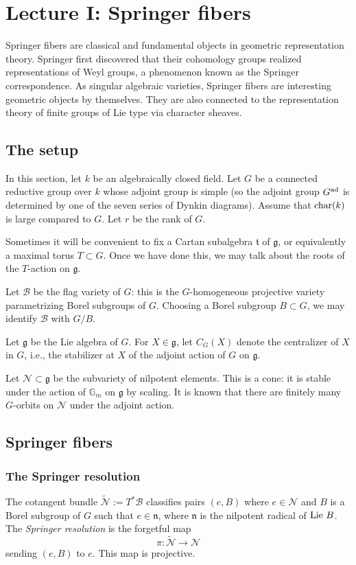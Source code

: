 \documentclass[]{pcmi}
\let\oldsubsubsection\subsubsection
\renewcommand{\subsubsection}[1]{%
\setcounter{subsubsection}{\value{equation}}%
\oldsubsubsection{#1}%
\refstepcounter{equation}%
}
\theoremstyle{plain}
\theoremstyle{definition}
\def\GG{\mathbb{G}}
\newcommand{\sB}{\ensuremath{\mathscr{B}}\xspace}
\newcommand{\sN}{\ensuremath{\mathscr{N}}\xspace}
\newcommand{\sB}{\ensuremath{\mathcal{B}}\xspace}
\newcommand{\sN}{\ensuremath{\mathcal{N}}\xspace}
\newcommand\frg{\mathfrak{g}}
\newcommand\frn{\mathfrak{n}}
\newcommand\frt{\mathfrak{t}}
\newcommand\Lie{\textup{Lie}\ }
\newcommand{\Gm}{\GG_m}
\newcommand{\ad}{\textup{ad}}
\newcommand{\wt}{\widetilde}
\newcommand\chark{\textup{char}(k)}
\newcommand{\tN}{\wt{\sN}}
\begin{document}
\section{Lecture I: Springer fibers}

Springer fibers are classical and fundamental objects in geometric representation theory. Springer \cite{Springer} first discovered that their cohomology groups realized representations of Weyl groups, a phenomenon known as the Springer correspondence. As singular algebraic varieties, Springer fibers are interesting geometric objects by themselves. They are also connected to the representation theory of finite groups of Lie type via character sheaves.

\subsection{The setup}\label{ss:notation}  In this section, let $k$ be an algebraically closed field. Let $G$ be a connected reductive group over $k$ whose adjoint group is simple (so the adjoint group $G^{\ad}$ is determined by one of the seven series of Dynkin diagrams). Assume that $\chark$ is large compared to $G$.  Let $r$ be the rank of $G$.

Sometimes it will be convenient to fix a Cartan subalgebra $\frt$ of $\frg$, or equivalently a maximal torus $T\subset G$. Once we have done this, we may talk about the roots of the $T$-action on $\frg$.
 
Let $\sB$ be the flag variety of $G$: this is the $G$-homogeneous projective variety parametrizing Borel subgroups of $G$. Choosing a Borel subgroup $B\subset G$, we may identify $\sB$ with $G/B$.

Let $\frg$ be the Lie algebra of $G$.  For $X\in\frg$, let $C_{G}(X)$ denote the centralizer of $X$ in $G$, i.e., the stabilizer at $X$ of the adjoint action of $G$ on $\frg$. 

Let $\sN\subset\frg$ be the subvariety of nilpotent elements. This is a cone: it is stable under the action of $\Gm$ on $\frg$ by scaling.  It is known that there are finitely many $G$-orbits on $\sN$ under the adjoint action. 


\subsection{Springer fibers}

\subsubsection{The Springer resolution} The cotangent bundle $\tN:=T^{*}\sB$ classifies pairs $(e, B)$ where $e\in\sN$ and $B$ is a Borel subgroup of $G$ such that $e\in \frn$, where $\frn$ is the nilpotent radical of $\Lie B$. The {\em Springer resolution} is the forgetful map
\begin{equation*}
\pi:\tN\to\sN
\end{equation*}
sending $(e, B)$ to $e$. This map is projective.
\end{document}
